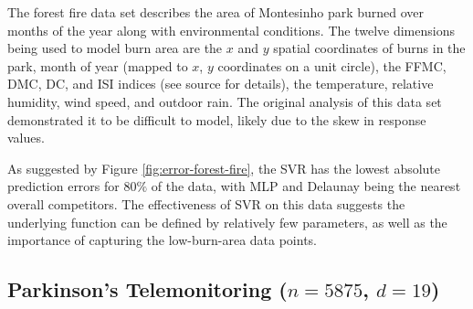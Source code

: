 \documentclass[smallextended,final]{svjour3}  %
\begin{document}
The forest fire data set \cite{cortez2007data} describes the area of
Montesinho park burned over months of the year along with
environmental conditions. The twelve dimensions being used to model
burn area are the $x$ and $y$ spatial coordinates of burns in the
park, month of year (mapped to $x$, $y$ coordinates on a unit circle),
the FFMC, DMC, DC, and ISI indices (see source for details), the
temperature, relative humidity, wind speed, and outdoor rain. The
original analysis of this data set demonstrated it to be difficult to
model, likely due to the skew in response values.

As suggested by Figure \ref{fig:error-forest-fire}, the SVR has the
lowest absolute prediction errors for $80\%$ of the data, with MLP and
Delaunay being the nearest overall competitors. The effectiveness of
SVR on this data suggests the underlying function can be defined by
relatively few parameters, as well as the importance of capturing the
low-burn-area data points.



\subsection{Parkinson's Telemonitoring ($n = 5875$, $d = 19$)}
\end{document}
